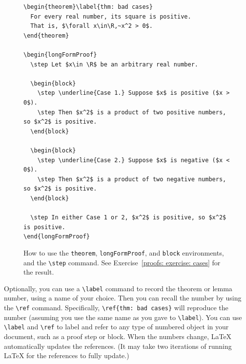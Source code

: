 \begin{figure}
\begin{framed}\small
\begin{verbatim}
\begin{theorem}\label{thm: bad cases}
  For every real number, its square is positive. 
  That is, $\forall x\in\R,~x^2 > 0$.
\end{theorem}

\begin{longFormProof}
  \step Let $x\in \R$ be an arbitrary real number.

  \begin{block}
    \step \underline{Case 1.} Suppose $x$ is positive ($x > 0$).
    \step Then $x^2$ is a product of two positive numbers, so $x^2$ is positive.
  \end{block}

  \begin{block}
    \step \underline{Case 2.} Suppose $x$ is negative ($x < 0$).
    \step Then $x^2$ is a product of two negative numbers, so $x^2$ is positive.
  \end{block}

  \step In either Case 1 or 2, $x^2$ is positive, so $x^2$ is positive.
\end{longFormProof}
\end{verbatim}
\vspace*{-10pt}
\end{framed}
\caption{How to use the \texttt{theorem}, \texttt{longFormProof}, and \texttt{block} environments,
  and the \texttt{\textbackslash step} command.
  See Exercise~\ref{proofs: exercise: cases} for the result.}\label{proofs: fig: blocks}
\end{figure}
%

Optionally, you can use a \texttt{\textbackslash label} command to 
record the theorem or lemma number, using a name of your choice.
Then you can recall the number by using the \texttt{\textbackslash ref} command.
Specifically, \texttt{\textbackslash ref\{thm:~bad cases\}} will reproduce the number
(assuming you use the same name as you gave to \texttt{\textbackslash label}).
You can use \texttt{\textbackslash label} and \texttt{\textbackslash ref}
to label and refer to any type of numbered object in your document,
such as a proof step or block.
When the numbers change, LaTeX automatically updates the references.
(It may take two iterations of running LaTeX for the references to fully update.)

